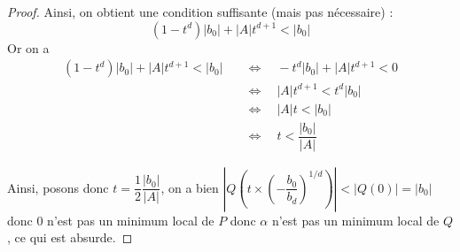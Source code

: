 \begin{proof}
Ainsi, on obtient une condition suffisante (mais pas nécessaire) :
\[
( 1 - t^d)|b_0| + |A| t^{d+1} < |b_0|
\]
Or on a 
\[
\begin{aligned}
(1 - t^d)|b_0| + |A| t^{d+1} < |b_0|
&\quad\Longleftrightarrow\quad 
- t^d|b_0| + |A| t^{d+1} < 0 \\
&\quad\Longleftrightarrow\quad 
|A| t^{d+1} < t^d|b_0|\\
&\quad\Longleftrightarrow\quad 
|A| t < |b_0|\\
&\quad\Longleftrightarrow\quad 
t < \dfrac{|b_0|}{|A|}
\end{aligned}
\]

Ainsi, posons donc $t =\dfrac{1}{2} \dfrac{|b_0|}{|A|}$, on a bien $\left|Q\left(t \times \left(-\dfrac{b_0}{b_d}\right)^{1 / d}\right)\right| < |Q(0)| = |b_0|$ donc $0$ n'est pas un minimum local de $P$ donc $\alpha$ n'est pas un minimum local de $Q$, ce qui est absurde. 
\end{proof}